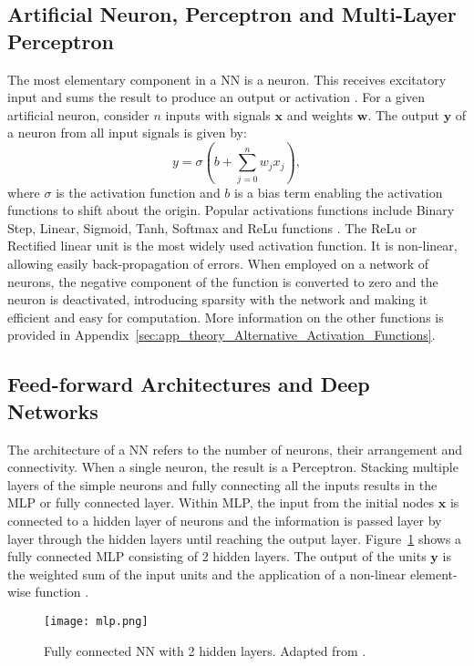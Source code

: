 \subsection{Artificial Neuron, Perceptron and Multi-Layer Perceptron}
The most elementary component in a NN is a neuron. This receives excitatory input and sums the result to produce an output or activation \citep{Raschka2017}. For a given artificial neuron, consider $n$ inputs with signals $\boldsymbol{x}$ and weights $\boldsymbol{w}$. The output $\boldsymbol{y}$ of a neuron from all input signals is given by:
\begin{equation}
	y=\sigma\left( b + \sum_{j=0}^{n}w_{j}x_j \right),
\end{equation}
where $\sigma$ is the activation function and $b$ is a bias term enabling the activation functions to shift about the origin. Popular activations functions include Binary Step, Linear, Sigmoid, Tanh, Softmax and ReLu functions \citep{Goodfellow2016}. The ReLu or Rectified linear unit is the most widely used activation function. It is non-linear, allowing easily back-propagation of errors. When employed on a network of neurons, the negative component of the function is converted to zero and the neuron is deactivated, introducing sparsity with the network and making it efficient and easy for computation. More information on the other functions is provided in Appendix~\ref{sec:app_theory_Alternative_Activation_Functions}.

\subsection{Feed-forward Architectures and Deep Networks}
The architecture of a NN refers to the number of neurons, their arrangement and connectivity. When a single neuron, the result is a Perceptron. Stacking multiple layers of the simple neurons and fully connecting all the inputs results in the MLP or fully connected layer. Within MLP, the input from the initial nodes $\boldsymbol{x}$ is connected to a hidden layer of neurons and the information is passed layer by layer through the hidden layers until reaching the output layer. Figure~\ref{fig:MLP_2_layersI} shows a fully connected MLP consisting of 2 hidden layers. The output of the units $\boldsymbol{y}$  is the weighted sum of the input units and the application of a non-linear element-wise function \citep{Lucas2018}.

\begin{figure}[ht!]
	\centering
	\texttt{[image: mlp.png]}
	\caption[Fully connected NN with 2 hidden layers.]{Fully connected NN with 2 hidden layers. 
	Adapted from \cite{Lucas2018}.}
	\label{fig:MLP_2_layersI}
\end{figure}

